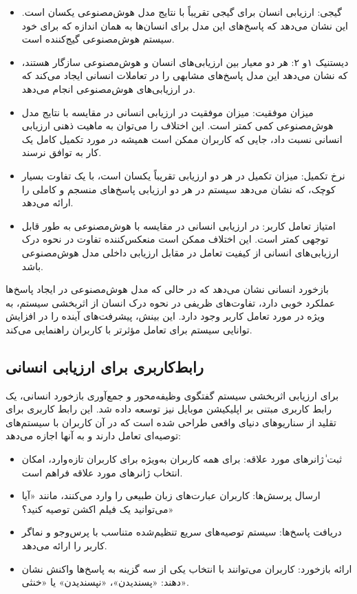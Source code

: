 \begin{itemize}
\item
گیجی: ارزیابی انسان برای گیجی تقریباً با نتایج مدل هوش‌مصنوعی یکسان است.
این نشان می‌دهد که پاسخ‌های این مدل برای انسان‌ها به همان اندازه که برای خود سیستم هوش‌مصنوعی گیج‌کننده است.
\item
دیستنیک ۱و ۲: هر دو معیار بین ارزیابی‌های انسان و هوش‌مصنوعی سازگار هستند، که نشان می‌دهد این مدل پاسخ‌های مشابهی را در تعاملات انسانی ایجاد می‌کند که در ارزیابی‌های هوش‌مصنوعی انجام می‌دهد.
\item
میزان موفقیت: میزان موفقیت در ارزیابی انسانی در مقایسه با نتایج مدل هوش‌مصنوعی کمی کمتر است. این اختلاف را می‌توان به ماهیت ذهنی ارزیابی انسانی نسبت داد، جایی که کاربران ممکن است همیشه در مورد تکمیل کامل یک کار به توافق نرسند.
\item
نرخ تکمیل: میزان تکمیل در هر دو ارزیابی تقریباً یکسان است، با یک تفاوت بسیار کوچک، که نشان می‌دهد سیستم در هر دو ارزیابی پاسخ‌های منسجم و کاملی را ارائه می‌دهد.
\item
 امتیاز تعامل کاربر: در ارزیابی انسانی در مقایسه با هوش‌مصنوعی به طور قابل ‌توجهی کمتر است. این اختلاف ممکن است منعکس‌کننده تفاوت در نحوه درک ارزیابی‌های انسانی از کیفیت تعامل در مقابل ارزیابی داخلی مدل هوش‌مصنوعی باشد.
\end{itemize}

بازخورد انسانی نشان می‌دهد که در حالی که مدل هوش‌مصنوعی در ایجاد پاسخ‌ها عملکرد خوبی دارد، تفاوت‌های ظریفی در نحوه درک انسان از اثربخشی سیستم، به ویژه در مورد تعامل کاربر وجود دارد. این بینش، پیشرفت‌های آینده را در افزایش توانایی سیستم برای تعامل مؤثرتر با کاربران راهنمایی می‌کند.

\subsection{رابط‌کاربری برای ارزیابی انسانی}

برای ارزیابی اثربخشی سیستم گفتگوی وظیفه‌محور و جمع‌آوری بازخورد انسانی، یک رابط کاربری مبتنی بر اپلیکیشن موبایل نیز توسعه داده شد. این رابط کاربری برای تقلید از سناریوهای دنیای واقعی طراحی شده است که در آن کاربران با سیستم‌های توصیه‌ای تعامل دارند و به آنها اجازه می‌دهد:
\begin{itemize}
\item
ثبت ٰژانرهای مورد علاقه: برای همه کاربران به‌ویژه برای کاربران تازه وارد، امکان انتخاب ژانرهای مورد علاقه فراهم است.
\item
 ارسال پرسش‌ها: کاربران عبارت‌های زبان طبیعی را وارد می‌کنند، مانند «آیا می‌توانید یک فیلم اکشن توصیه کنید؟»
\item
 دریافت پاسخ‌ها: سیستم توصیه‌های سریع تنظیم‌شده متناسب با پرس‌و‌جو و نماگر کاربر را ارائه می‌دهد.
\item
 ارائه بازخورد: کاربران می‌توانند با انتخاب یکی از سه گزینه به پاسخ‌ها واکنش نشان دهند: «پسندیدن»، «نپسندیدن» یا «خنثی».
\end{itemize}

